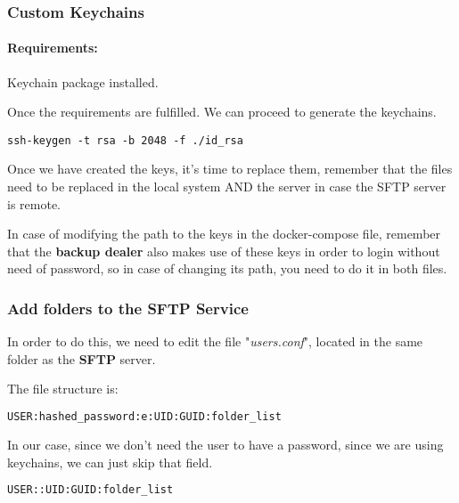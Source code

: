 \subsubsection[Custom Keychains]{Custom Keychains}
\paragraph{Requirements:} Keychain package installed.
\begin{flushleft}

    Once the requirements are fulfilled.
    We can proceed to generate the keychains.
    \begin{lstlisting}[label={lst:generating_keychain,language=bash}]
ssh-keygen -t rsa -b 2048 -f ./id_rsa\end{lstlisting}
\end{flushleft}
\begin{flushleft}
    Once we have created the keys, it's time to replace them, remember that the files need to be replaced in the local
    system AND the server in case the SFTP server is remote.
\end{flushleft}
\begin{flushleft}
    In case of modifying the path to the keys in the docker-compose file, remember that the \textbf{backup dealer} also
    makes use of these keys in order to login without need of password, so in case of changing its path, you need to do
    it in both files.
\end{flushleft}
%

\subsubsection[Add folders to the SFTP Service]{Add folders to the SFTP Service}
\begin{flushleft}
    In order to do this, we need to edit the file "\textit{users.conf}", located in the same folder as the \textbf{SFTP} server.
    
    The file structure is:

\begin{lstlisting}[language=bash,label={lst:users.conf_hash_structure}]
USER:hashed_password:e:UID:GUID:folder_list\end{lstlisting}
    In our case, since we don't need the user to have a password, since we are using keychains, we can just skip that field.
    \begin{lstlisting}[language=bash,label={lst:users.conf_structure}]
USER::UID:GUID:folder_list\end{lstlisting}
\end{flushleft}

